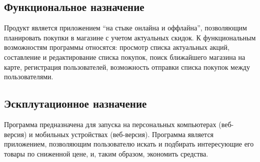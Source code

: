 \subsection{Функциональное назначение}
Продукт является приложением ``на стыке онлайна и оффлайна'', позволяющим планировать
покупки в магазине с учетом актуальных скидок. 
К функциональным возможностям программы относятся:
просмотр списка актуальных акций,
составление и редактирование списка покупок, 
поиск ближайшего магазина на карте,
регистрация пользователей,
возможность отправки списка покупок между пользователями.

\subsection{Эскплутационное назначение}
Программа предназначена для запуска на персональных компьютерах (веб-версия) и 
мобильных устройствах (веб-версия). Программа является 
приложением, позволяющим пользователю искать и подбирать интересующие его товары 
по сниженной цене, и, таким образом, экономить средства. 



